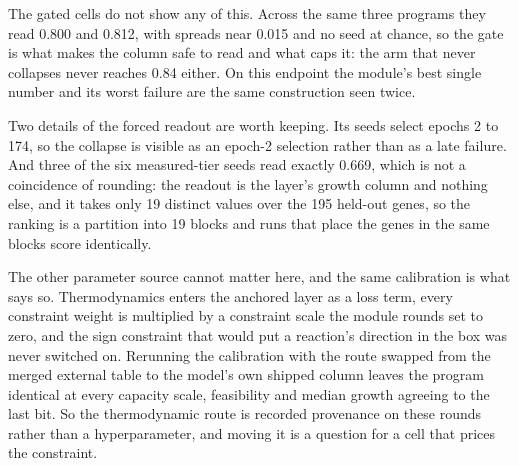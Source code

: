 


The gated cells do not show any of this. Across the same three programs they read 0.800
and 0.812, with spreads near 0.015 and no seed at chance, so the gate is what makes the
column safe to read and what caps it: the arm that never collapses never reaches 0.84
either. On this endpoint the module's best single number and its worst failure are the
same construction seen twice.

Two details of the forced readout are worth keeping. Its seeds select epochs 2 to 174,
so the collapse is visible as an epoch-2 selection rather than as a late failure. And
three of the six measured-tier seeds read exactly 0.669, which is not a coincidence of
rounding: the readout is the layer's growth column and nothing else, and it takes only
19 distinct values over the 195 held-out genes, so the ranking is a partition into 19
blocks and runs that place the genes in the same blocks score identically.

The other parameter source cannot matter here, and the same calibration is what says
so. Thermodynamics enters the anchored layer as a loss term, every constraint weight is
multiplied by a constraint scale the module rounds set to zero, and the sign constraint
that would put a reaction's direction in the box was never switched on. Rerunning the
calibration with the route swapped from the merged external table to the model's own
shipped column leaves the program identical at every capacity scale, feasibility and
median growth agreeing to the last bit. So the thermodynamic route is recorded
provenance on these rounds rather than a hyperparameter, and moving it is a question for
a cell that prices the constraint.

